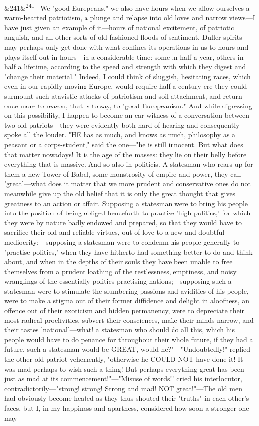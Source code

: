 \documentclass[12pt]{article}
\newcommand{\para}[1][]{\par\noindent\ifx&#1&\else\textsuperscript{\footnotesize #1}~\fi}
\begin{document}
\para[241] We "good Europeans," we also have hours when we allow ourselves a warm-hearted patriotism, a plunge and relapse into old loves and narrow views---I have just given an example of it---hours of national excitement, of patriotic anguish, and all other sorts of old-fashioned floods of sentiment. Duller spirits may perhaps only get done with what confines its operations in us to hours and plays itself out in hours---in a considerable time: some in half a year, others in half a lifetime, according to the speed and strength with which they digest and "change their material." Indeed, I could think of sluggish, hesitating races, which even in our rapidly moving Europe, would require half a century ere they could surmount such atavistic attacks of patriotism and soil-attachment, and return once more to reason, that is to say, to "good Europeanism." And while digressing on this possibility, I happen to become an ear-witness of a conversation between two old patriots---they were evidently both hard of hearing and consequently spoke all the louder. "HE has as much, and knows as much, philosophy as a peasant or a corps-student," said the one---"he is still innocent. But what does that matter nowadays! It is the age of the masses: they lie on their belly before everything that is massive. And so also in politicis. A statesman who rears up for them a new Tower of Babel, some monstrosity of empire and power, they call 'great'---what does it matter that we more prudent and conservative ones do not meanwhile give up the old belief that it is only the great thought that gives greatness to an action or affair. Supposing a statesman were to bring his people into the position of being obliged henceforth to practise 'high politics,' for which they were by nature badly endowed and prepared, so that they would have to sacrifice their old and reliable virtues, out of love to a new and doubtful mediocrity;---supposing a statesman were to condemn his people generally to 'practise politics,' when they have hitherto had something better to do and think about, and when in the depths of their souls they have been unable to free themselves from a prudent loathing of the restlessness, emptiness, and noisy wranglings of the essentially politics-practising nations;---supposing such a statesman were to stimulate the slumbering passions and avidities of his people, were to make a stigma out of their former diffidence and delight in aloofness, an offence out of their exoticism and hidden permanency, were to depreciate their most radical proclivities, subvert their consciences, make their minds narrow, and their tastes 'national'---what! a statesman who should do all this, which his people would have to do penance for throughout their whole future, if they had a future, such a statesman would be GREAT, would he?"---"Undoubtedly!" replied the other old patriot vehemently, "otherwise he COULD NOT have done it! It was mad perhaps to wish such a thing! But perhaps everything great has been just as mad at its commencement!"---"Misuse of words!" cried his interlocutor, contradictorily---"strong! strong! Strong and mad! NOT great!"---The old men had obviously become heated as they thus shouted their "truths" in each other's faces, but I, in my happiness and apartness, considered how soon a stronger one may 
\end{document}
